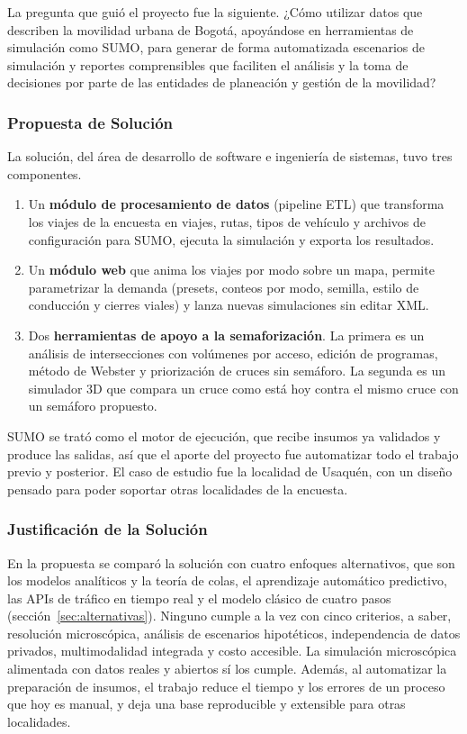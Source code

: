 La pregunta que guió el proyecto fue la siguiente. ¿Cómo utilizar datos que describen la movilidad urbana de Bogotá, apoyándose en herramientas de simulación como SUMO, para generar de forma automatizada escenarios de simulación y reportes comprensibles que faciliten el análisis y la toma de decisiones por parte de las entidades de planeación y gestión de la movilidad?

\subsubsection{Propuesta de Solución}

La solución, del área de desarrollo de software e ingeniería de sistemas, tuvo tres componentes.

\begin{enumerate}[noitemsep]
    \item Un \textbf{módulo de procesamiento de datos} (pipeline ETL) que transforma los viajes de la encuesta en viajes, rutas, tipos de vehículo y archivos de configuración para SUMO, ejecuta la simulación y exporta los resultados.
    \item Un \textbf{módulo web} que anima los viajes por modo sobre un mapa, permite parametrizar la demanda (presets, conteos por modo, semilla, estilo de conducción y cierres viales) y lanza nuevas simulaciones sin editar XML.
    \item Dos \textbf{herramientas de apoyo a la semaforización}. La primera es un análisis de intersecciones con volúmenes por acceso, edición de programas, método de Webster y priorización de cruces sin semáforo. La segunda es un simulador 3D que compara un cruce como está hoy contra el mismo cruce con un semáforo propuesto.
\end{enumerate}

SUMO se trató como el motor de ejecución, que recibe insumos ya validados y produce las salidas, así que el aporte del proyecto fue automatizar todo el trabajo previo y posterior. El caso de estudio fue la localidad de Usaquén, con un diseño pensado para poder soportar otras localidades de la encuesta.

\subsubsection{Justificación de la Solución}

En la propuesta se comparó la solución con cuatro enfoques alternativos, que son los modelos analíticos y la teoría de colas, el aprendizaje automático predictivo, las APIs de tráfico en tiempo real y el modelo clásico de cuatro pasos (sección~\ref{sec:alternativas}). Ninguno cumple a la vez con cinco criterios, a saber, resolución microscópica, análisis de escenarios hipotéticos, independencia de datos privados, multimodalidad integrada y costo accesible. La simulación microscópica alimentada con datos reales y abiertos sí los cumple. Además, al automatizar la preparación de insumos, el trabajo reduce el tiempo y los errores de un proceso que hoy es manual, y deja una base reproducible y extensible para otras localidades.

